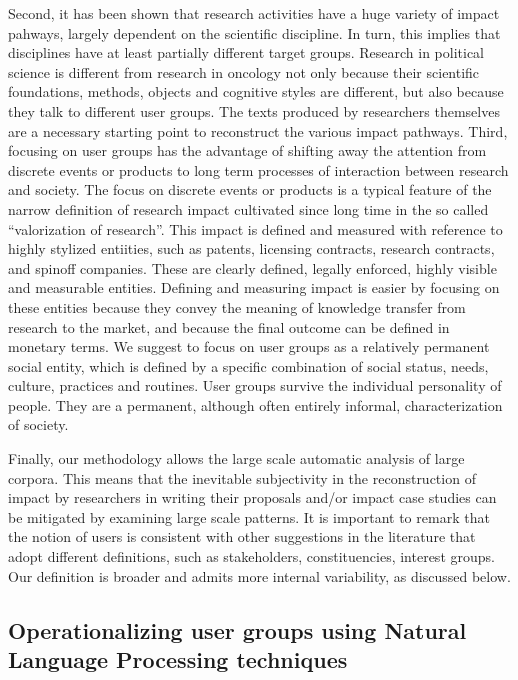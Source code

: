 \documentclass[]{book}
\begin{document}
Second, it has been shown that research activities have a huge variety
of impact pahways, largely dependent on the scientific discipline. In
turn, this implies that disciplines have at least partially different
target groups. Research in political science is different from research
in oncology not only because their scientific foundations, methods,
objects and cognitive styles are different, but also because they talk
to different user groups. The texts produced by researchers themselves
are a necessary starting point to reconstruct the various impact
pathways. Third, focusing on user groups has the advantage of shifting
away the attention from discrete events or products to long term
processes of interaction between research and society. The focus on
discrete events or products is a typical feature of the narrow
definition of research impact cultivated since long time in the so
called ``valorization of research''. This impact is defined and measured
with reference to highly stylized entiities, such as patents, licensing
contracts, research contracts, and spinoff companies. These are clearly
defined, legally enforced, highly visible and measurable entities.
Defining and measuring impact is easier by focusing on these entities
because they convey the meaning of knowledge transfer from research to
the market, and because the final outcome can be defined in monetary
terms. We suggest to focus on user groups as a relatively permanent
social entity, which is defined by a specific combination of social
status, needs, culture, practices and routines. User groups survive the
individual personality of people. They are a permanent, although often
entirely informal, characterization of society.

Finally, our methodology allows the large scale automatic analysis of
large corpora. This means that the inevitable subjectivity in the
reconstruction of impact by researchers in writing their proposals
and/or impact case studies can be mitigated by examining large scale
patterns. It is important to remark that the notion of users is
consistent with other suggestions in the literature that adopt different
definitions, such as stakeholders, constituencies, interest groups. Our
definition is broader and admits more internal variability, as discussed
below.

\subsection{Operationalizing user groups using Natural Language
Processing
techniques}\label{operationalizing-user-groups-using-natural-language-processing-techniques}
\end{document}
